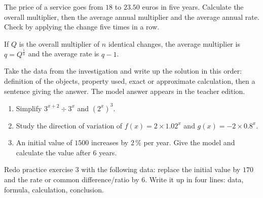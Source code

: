 \begin{activite}
The price of a service goes from $18$ to $23.50$ euros in five years. Calculate the overall multiplier, then the average annual multiplier and the average annual rate. Check by applying the change five times in a row.

\end{activite}

\begin{traceecrite}If $Q$ is the overall multiplier of $n$ identical changes, the average multiplier is $q=Q^{\frac1n}$ and the average rate is $q-1$.\end{traceecrite}

\begin{exemple}
Take the data from the investigation and write up the solution in this order: definition of the objects, property used, exact or approximate calculation, then a sentence giving the answer. The model answer appears in the teacher edition.
\end{exemple}

\begin{exercice}[-- essential]
\begin{enumerate}\item Simplify $3^{x+2}\div3^x$ and $(2^x)^3$.\item Study the direction of variation of $f(x)=2\times1.02^x$ and $g(x)=-2\times0.8^x$.\item An initial value of $1500$ increases by $2\,\%$ per year. Give the model and calculate the value after $6$ years.\end{enumerate}
\end{exercice}


\begin{dm}Redo practice exercise 3 with the following data: replace the initial value by $170$ and the rate or common difference/ratio by $6$. Write it up in four lines: data, formula, calculation, conclusion.\end{dm}

